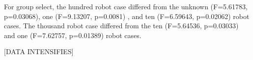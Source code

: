 For group select, the hundred robot case differed from the unknown (F=5.61783, p=0.03068), one (F=9.13207, p=0.0081) , and ten (F=6.59643, p=0.02062) robot cases. The thousand robot case differed from the ten (F=5.64536, p=0.03033) and one (F=7.62757, p=0.01389) robot cases.



%
%
%
%
%

[DATA INTENSIFIES]








